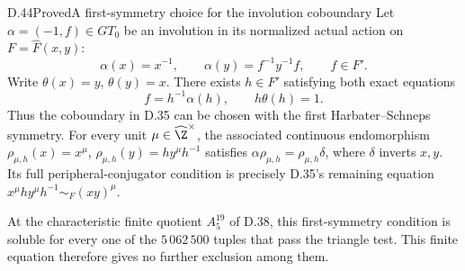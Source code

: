 \begin{claim}{D.44}{Proved}{A first-symmetry choice for the involution coboundary}
Let $\alpha=(-1,f)\in GT_0$ be an involution in its
normalized actual action on $F=\widehat F(x,y)$:
\[
 \alpha(x)=x^{-1},\qquad
 \alpha(y)=f^{-1}y^{-1}f,\qquad f\in F'.
\]
Write $\theta(x)=y$, $\theta(y)=x$.
There exists $h\in F'$ satisfying both exact equations
\[
               f=h^{-1}\alpha(h),\qquad h\theta(h)=1.
                                                        \tag{D.44a}
\]
Thus the coboundary in D.35 can be chosen with the
first Harbater--Schneps symmetry.  For every unit
$\mu\in\widehat\Z^\times$, the associated continuous
endomorphism
$\rho_{\mu,h}(x)=x^\mu$,
$\rho_{\mu,h}(y)=hy^\mu h^{-1}$ satisfies
$\alpha\rho_{\mu,h}=\rho_{\mu,h}\delta$, where
$\delta$ inverts $x,y$.
Its full peripheral-conjugator condition is precisely
D.35's remaining equation
$x^\mu hy^\mu h^{-1}\sim_F(xy)^\mu$.

At the characteristic finite quotient $A_5^{19}$
of D.38, this first-symmetry condition is soluble
for every one of the $5\,062\,500$ tuples that
pass the triangle test.  This finite equation
therefore gives no further exclusion among them.
\end{claim}
